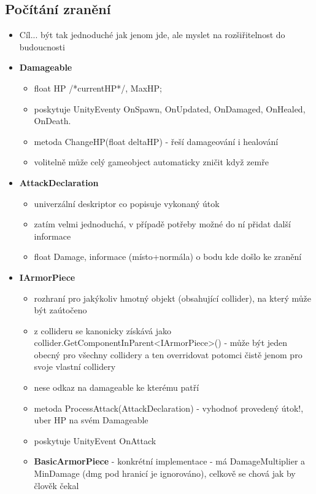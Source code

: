 \subsection{Počítání zranění}
\begin{itemize}
  \item Cíl... být tak jednoduché jak jenom jde, ale myslet na rozšiřitelnost do budoucnosti
  \item \textbf{Damageable}
    \begin{itemize}
      \item float HP /*currentHP*/, MaxHP;
      \item poskytuje UnityEventy OnSpawn, OnUpdated, OnDamaged, OnHealed, OnDeath.
      \item metoda ChangeHP(float deltaHP) - řeší damageování i healování
      \item volitelně může celý gameobject automaticky zničit když zemře
    \end{itemize} 
  \item \textbf{AttackDeclaration}
      \begin{itemize}
        \item univerzální deskriptor co popisuje vykonaný útok
        \item zatím velmi jednoduchá, v případě potřeby možné do ní přidat další informace
        \item float Damage, informace (místo+normála) o bodu kde došlo ke zranění
      \end{itemize} 
  \item \textbf{IArmorPiece}
      \begin{itemize}
        \item rozhraní pro jakýkoliv hmotný objekt (obsahující collider), na který může být zaútočeno
        \item z collideru se kanonicky získává jako collider.GetComponentInParent<IArmorPiece>() - může být jeden obecný pro všechny collidery a ten overridovat potomci čistě jenom pro svoje vlastní collidery
        \item nese odkaz na damageable ke kterému patří
        \item metoda ProcessAttack(AttackDeclaration) - vyhodnoť provedený útok!, uber HP na svém Damageable
        \item poskytuje UnityEvent OnAttack
        \item \textbf{BasicArmorPiece} - konkrétní implementace - má DamageMultiplier a MinDamage (dmg pod hranicí je ignorováno), celkově se chová jak by člověk čekal

\end{itemize}
\end{itemize}
